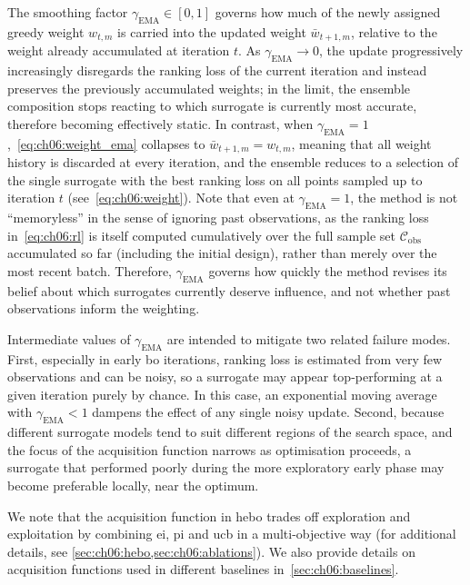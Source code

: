 The smoothing factor $\gamma_{\mathrm{EMA}} \in [0,1]$ governs how much of the newly assigned greedy weight ${w}_{t,m}$ is carried into the updated weight $\bar{w}_{t+1,m}$, relative to the weight already accumulated at iteration $t$.
As $\gamma_{\mathrm{EMA}} \to 0$, the update
progressively increasingly
disregards the ranking loss of the current iteration and instead preserves the previously accumulated weights; in the limit, the ensemble composition stops reacting to which surrogate is currently most accurate, therefore becoming effectively static.
In contrast, when $\gamma_{\mathrm{EMA}} = 1$,~\cref{eq:ch06:weight_ema} collapses to $\bar{w}_{t+1,m} = {w}_{t,m}$, meaning that all weight history is discarded at every iteration, and the ensemble reduces to a selection of the single surrogate with the best ranking loss on all points sampled up to iteration $t$ (see~\cref{eq:ch06:weight}).
Note that even at $\gamma_{\mathrm{EMA}} = 1$, the method is not ``memoryless'' in the sense of ignoring past observations, as the ranking loss in~\cref{eq:ch06:rl} is itself computed cumulatively over the full sample set $\mathcal C_{\mathrm{obs}}$ accumulated so far (including the initial design), rather than merely over the most recent batch.
Therefore, $\gamma_{\mathrm{EMA}}$ governs how quickly the method revises its belief about which surrogates currently deserve influence, and not whether past observations inform the weighting.

Intermediate values of $\gamma_{\mathrm{EMA}}$ are intended to mitigate two related failure modes.
First, especially in early \gls{bo} iterations, ranking loss is estimated from very few observations and can be noisy, so a surrogate may appear top-performing at a given iteration purely by chance.
In this case, an exponential moving average with $\gamma_{\mathrm{EMA}} < 1$ dampens the effect of any single noisy update.
Second, because different surrogate models tend to suit different regions of the search space, and the focus of the acquisition function narrows as optimisation proceeds, a surrogate that performed poorly during the more exploratory early phase may become preferable locally, near the optimum.

We note that the acquisition function in \gls{hebo} trades off exploration and exploitation by combining \gls{ei}, \gls{pi} and \gls{ucb} in a multi-objective way (for additional details, see \cref{sec:ch06:hebo,sec:ch06:ablations}).
We also provide details on acquisition functions used in different baselines in~\cref{sec:ch06:baselines}.


